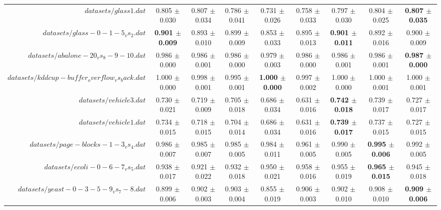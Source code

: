 \begin{table}[!ht]
{\begin{tabular}{r c c c c c c c c}
$datasets/glass1.dat$ & 0.805 $\pm$ 0.030 & 0.807 $\pm$ 0.034 & 0.786 $\pm$ 0.041 & 0.731 $\pm$ 0.026 & 0.758 $\pm$ 0.033 & 0.797 $\pm$ 0.030 & 0.804 $\pm$ 0.025 & \textbf{0.807 $\pm$ 0.035} \\
$datasets/glass-0-1-5_vs_2.dat$ & \textbf{0.901 $\pm$ 0.009} & 0.893 $\pm$ 0.010 & 0.899 $\pm$ 0.009 & 0.853 $\pm$ 0.033 & 0.895 $\pm$ 0.013 & \textbf{0.901 $\pm$ 0.011} & 0.892 $\pm$ 0.016 & 0.900 $\pm$ 0.009 \\
$datasets/abalone-20_vs_8-9-10.dat$ & 0.986 $\pm$ 0.000 & 0.986 $\pm$ 0.001 & 0.986 $\pm$ 0.000 & 0.979 $\pm$ 0.003 & 0.986 $\pm$ 0.000 & 0.986 $\pm$ 0.001 & 0.986 $\pm$ 0.001 & \textbf{0.987 $\pm$ 0.000} \\
$datasets/kddcup-buffer_overflow_vs_back.dat$ & 1.000 $\pm$ 0.000 & 0.998 $\pm$ 0.001 & 0.995 $\pm$ 0.001 & \textbf{1.000 $\pm$ 0.000} & 0.997 $\pm$ 0.002 & 1.000 $\pm$ 0.000 & 1.000 $\pm$ 0.001 & 1.000 $\pm$ 0.001 \\
$datasets/vehicle3.dat$ & 0.730 $\pm$ 0.021 & 0.719 $\pm$ 0.009 & 0.705 $\pm$ 0.018 & 0.686 $\pm$ 0.034 & 0.631 $\pm$ 0.016 & \textbf{0.742 $\pm$ 0.018} & 0.739 $\pm$ 0.017 & 0.727 $\pm$ 0.017 \\
$datasets/vehicle1.dat$ & 0.734 $\pm$ 0.015 & 0.718 $\pm$ 0.015 & 0.704 $\pm$ 0.014 & 0.686 $\pm$ 0.034 & 0.631 $\pm$ 0.016 & \textbf{0.739 $\pm$ 0.017} & 0.737 $\pm$ 0.015 & 0.727 $\pm$ 0.015 \\
$datasets/page-blocks-1-3_vs_4.dat$ & 0.986 $\pm$ 0.007 & 0.985 $\pm$ 0.007 & 0.985 $\pm$ 0.005 & 0.984 $\pm$ 0.011 & 0.961 $\pm$ 0.005 & 0.990 $\pm$ 0.005 & \textbf{0.995 $\pm$ 0.006} & 0.992 $\pm$ 0.005 \\
$datasets/ecoli-0-6-7_vs_5.dat$ & 0.938 $\pm$ 0.017 & 0.921 $\pm$ 0.022 & 0.932 $\pm$ 0.018 & 0.950 $\pm$ 0.021 & 0.958 $\pm$ 0.016 & 0.955 $\pm$ 0.019 & \textbf{0.965 $\pm$ 0.015} & 0.945 $\pm$ 0.018 \\
$datasets/yeast-0-3-5-9_vs_7-8.dat$ & 0.899 $\pm$ 0.006 & 0.902 $\pm$ 0.003 & 0.903 $\pm$ 0.004 & 0.855 $\pm$ 0.019 & 0.906 $\pm$ 0.003 & 0.902 $\pm$ 0.010 & 0.908 $\pm$ 0.010 & \textbf{0.909 $\pm$ 0.006} \\
\end{tabular}}
\end{table}
